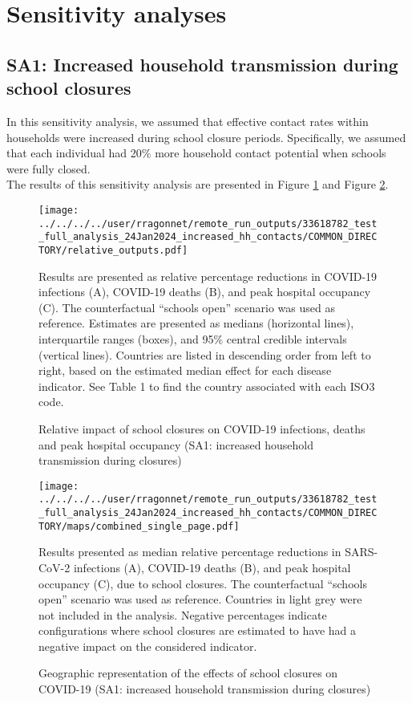\section{Sensitivity analyses}

\subsection{SA1: Increased household transmission during school closures}
In this sensitivity analysis, we assumed that effective contact rates within households were increased during school closure periods. 
Specifically, we assumed that each individual had 20\% more household contact potential when schools were fully closed.\\
The results of this sensitivity analysis are presented in Figure \ref{fig:SA1_rel_outputs} and Figure \ref{fig:SA1_maps}.

\begin{figure}[!ht]
    \begin{center}
    \texttt{[image: ../../../../user/rragonnet/remote\_run\_outputs/33618782\_test\_full\_analysis\_24Jan2024\_increased\_hh\_contacts/COMMON\_DIRECTORY/relative\_outputs.pdf]}
    \end{center}
    \caption{Relative impact of school closures on COVID-19 infections, deaths and peak hospital occupancy (SA1: increased household transmission during closures)} 
    Results are presented as relative percentage reductions in COVID-19 infections (A), 
    COVID-19 deaths (B), and peak hospital occupancy (C). The counterfactual ``schools open'' scenario was used as reference. 
    Estimates are presented as medians (horizontal lines), interquartile ranges (boxes), and 95\% central credible intervals (vertical lines). 
    Countries are listed in descending order from left to right, based on the estimated median effect for each disease indicator. See Table 1 to find the country associated with each ISO3 code. 
    \label{fig:SA1_rel_outputs}
\end{figure}

\begin{figure}[!ht]
    \begin{center}
    \texttt{[image: ../../../../user/rragonnet/remote\_run\_outputs/33618782\_test\_full\_analysis\_24Jan2024\_increased\_hh\_contacts/COMMON\_DIRECTORY/maps/combined\_single\_page.pdf]}
    \end{center}
    \caption{Geographic representation of the effects of school closures on COVID-19 (SA1: increased household transmission during closures)} 
    Results presented as median relative percentage reductions in SARS-CoV-2 infections (A), COVID-19 deaths (B), and peak hospital occupancy (C), due to school closures. The counterfactual “schools open” scenario was used as reference. Countries in light grey were not included in the analysis. Negative percentages indicate configurations where school closures are estimated to have had a negative impact on the considered indicator.
    \label{fig:SA1_maps}
\end{figure}



